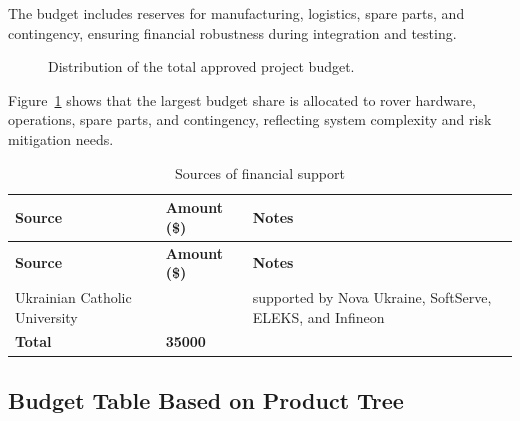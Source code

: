 The budget includes reserves for manufacturing, logistics, spare parts, and contingency,
ensuring financial robustness during integration and testing.

\begin{figure}[H]
\centering
{}
\caption{Distribution of the total approved project budget.}
\label{fig:budget_distribution}
\end{figure}

Figure~\ref{fig:budget_distribution} shows that the largest budget share is allocated to rover hardware,
operations, spare parts, and contingency, reflecting system complexity and risk mitigation needs.

\begin{longtable}{@{}p{5.5cm}p{2.2cm}p{5.8cm}@{}}
\caption{Sources of financial support}
\label{tab:budget_sources} \\

\toprule
\textbf{Source} & \centering\textbf{Amount (\$)} & \textbf{Notes} \tabularnewline
\midrule
\endfirsthead

\toprule
\textbf{Source} & \centering\textbf{Amount (\$)} & \textbf{Notes} \tabularnewline
\midrule
\endhead

Ukrainian Catholic University & \raggedleft 35000 & supported by Nova Ukraine, SoftServe, ELEKS, and Infineon \tabularnewline

\midrule
\textbf{Total} & \raggedleft\textbf{35000} & \tabularnewline
\bottomrule
\end{longtable}

\subsection{Budget Table Based on Product Tree}
\label{subsec:budget_product_tree}

